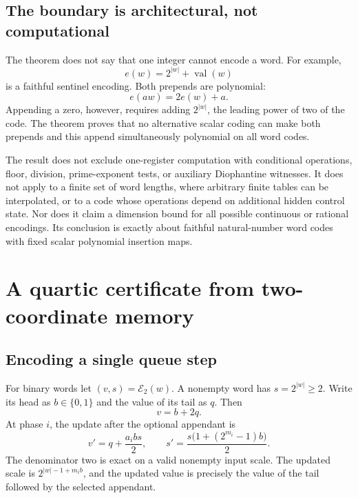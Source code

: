\documentclass[11pt,a4paper]{article}
\theoremstyle{definition}
\theoremstyle{remark}
\newcommand{\val}{\operatorname{val}}
\newcommand{\srctag}[1]{\texorpdfstring{\hspace{0.5em}{\normalfont\small\color{accent}[#1]}}{ [#1]}}
\begin{document}
\subsection{The boundary is architectural, not computational}
The theorem does not say that one integer cannot encode a word. For example,
\[
 e(w)=2^{|w|}+\val(w)
\]
is a faithful sentinel encoding. Both prepends are polynomial:
\[
 e(aw)=2e(w)+a.
\]
Appending a zero, however, requires adding $2^{|w|}$, the leading power of two of the code. The theorem proves that no alternative scalar coding can make both prepends and this append simultaneously polynomial on all word codes.

The result does not exclude one-register computation with conditional operations, floor, division, prime-exponent tests, or auxiliary Diophantine witnesses. It does not apply to a finite set of word lengths, where arbitrary finite tables can be interpolated, or to a code whose operations depend on additional hidden control state. Nor does it claim a dimension bound for all possible continuous or rational encodings. Its conclusion is exactly about faithful natural-number word codes with fixed scalar polynomial insertion maps.

\section{A quartic certificate from two-coordinate memory\srctag{07}}\label{cdc:qc:sec:quartic}
\subsection{Encoding a single queue step}
For binary words let $(v,s)=\mathcal E_2(w)$. A nonempty word has $s=2^{|w|}\geq2$. Write its head as $b\in\{0,1\}$ and the value of its tail as $q$. Then
\[
 v=b+2q.
\]
At phase $i$, the update after the optional appendant is
\begin{equation}\label{cdc:qc:eq:local-step}
 v'=q+\frac{a_i b s}{2},\qquad
 s'=\frac{s\bigl(1+(2^{m_i}-1)b\bigr)}{2}.
\end{equation}
The denominator two is exact on a valid nonempty input scale. The updated scale is $2^{|w|-1+m_i b}$, and the updated value is precisely the value of the tail followed by the selected appendant.
\end{document}

